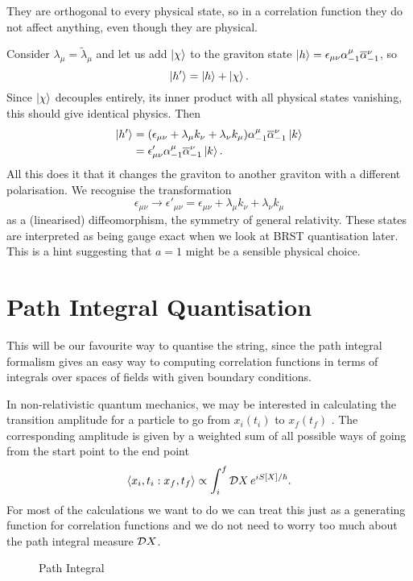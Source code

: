
They are orthogonal to every physical state, so in a correlation function they do not affect anything, even though they are physical.

Consider $\lambda_{\mu} = \widetilde{\lambda}_{\mu}$ and let us add $\ket{\chi}$ to the graviton state $\ket{h} = \epsilon_{\mu\nu} \alpha^{\mu}_{-1} \overline{\alpha}{}^{\nu}_{-1}$, so
\begin{equation}
  \ket{h'} = \ket{h} + \ket{\chi}.
\end{equation}
Since $\ket{\chi}$  decouples entirely, its inner product with all physical states vanishing, this should give identical physics.
Then
\begin{align}
  \ket{h'} &= (\epsilon_{\mu\nu} + \lambda_{\mu} k_{\nu} + \lambda_{\nu} k_{\mu}) \alpha^{\mu}_{-1} \overline{\alpha}{}^{\nu}_{-1} \ket{k} \\
  &= \epsilon'_{\mu\nu} \alpha^{\mu}_{-1}\overline{\alpha}{}^{\nu}_{-1} \ket{k}.
\end{align}
All this does it that it changes the graviton to another graviton with a different polarisation. We recognise the transformation
\begin{equation}
  \epsilon_{\mu\nu} \to \epsilon'_{\mu\nu} = \epsilon_{\mu\nu} + \lambda_{\mu} k_{\nu} + \lambda_{\nu} k_{\mu}
\end{equation}
as a (linearised) diffeomorphism, the symmetry of general relativity.
These states are interpreted as being gauge exact when we look at BRST quantisation later.
This is a hint suggesting that $a = 1$  might be a sensible physical choice.

\chapter{Path Integral Quantisation}%
\label{cha:path_integral_quantisation}

This will be our favourite way to quantise the string, since the path integral formalism gives an easy way to computing correlation functions in terms of integrals over spaces of fields with given boundary conditions.

\begin{example}[$d = 1$]
  In non-relativistic quantum mechanics, we may be interested in calculating the transition amplitude for a particle to go from $x_i (t_i)$  to $x_f(t_f)$ . The corresponding amplitude is given by a weighted sum of all possible ways of going from the start point to the end point
  \begin{equation}
    \langle x_i, t_i : x_f, t_f \rangle \propto \int_i^f \mathop{\mathcal{D} X} e^{i S[X] / \hbar}.
  \end{equation}
  For most of the calculations we want to do we can treat this just as a generating function for correlation functions and we do not need to worry too much about the path integral measure $\mathop{\mathcal{D} X}$.
  \begin{figure}[tbhp]
    \centering
    \def\svgwidth{0.4\columnwidth}
    
    \caption{Path Integral}
    \label{fig:l7f1}
  \end{figure}
\end{example}

